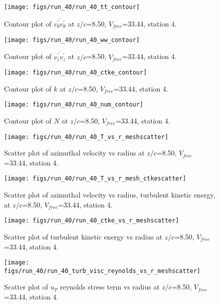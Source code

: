 \begin{figure}[H]
\centering
\texttt{[image: figs/run\_40/run\_40\_tt\_contour]}
\caption{Contour plot of $\overline{v_{\theta}^{\prime} v_{\theta}^{\prime}}$ at $z/c$=8.50, $V_{free}$=33.44, station 4.}
\end{figure}


\begin{figure}[H]
\centering
\texttt{[image: figs/run\_40/run\_40\_ww\_contour]}
\caption{Contour plot of $\overline{v_{z}^{\prime} v_{z}^{\prime}}$ at $z/c$=8.50, $V_{free}$=33.44, station 4.}
\end{figure}


\begin{figure}[H]
\centering
\texttt{[image: figs/run\_40/run\_40\_ctke\_contour]}
\caption{Contour plot of $k$ at $z/c$=8.50, $V_{free}$=33.44, station 4.}
\end{figure}


\begin{figure}[H]
\centering
\texttt{[image: figs/run\_40/run\_40\_num\_contour]}
\caption{Contour plot of $N$ at $z/c$=8.50, $V_{free}$=33.44, station 4.}
\end{figure}


\begin{figure}[H]
\centering
\texttt{[image: figs/run\_40/run\_40\_T\_vs\_r\_meshscatter]}
\caption{Scatter plot of azimuthal velocity vs radius at $z/c$=8.50, $V_{free}$=33.44, station 4.}
\end{figure}


\begin{figure}[H]
\centering
\texttt{[image: figs/run\_40/run\_40\_T\_vs\_r\_mesh\_ctkescatter]}
\caption{Scatter plot of azimuthal velocity vs radius, turbulent kinetic energy, at $z/c$=8.50, $V_{free}$=33.44, station 4.}
\end{figure}


\begin{figure}[H]
\centering
\texttt{[image: figs/run\_40/run\_40\_ctke\_vs\_r\_meshscatter]}
\caption{Scatter plot of turbulent kinetic energy vs radius at $z/c$=8.50, $V_{free}$=33.44, station 4.}
\end{figure}


\begin{figure}[H]
\centering
\texttt{[image: figs/run\_40/run\_40\_turb\_visc\_reynolds\_vs\_r\_meshscatter]}
\caption{Scatter plot of $
u_T$ reynolds stress term vs radius at $z/c$=8.50, $V_{free}$=33.44, station 4.}
\end{figure}


